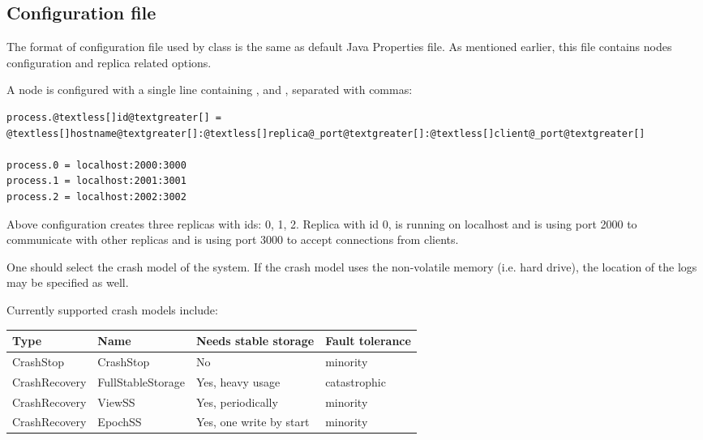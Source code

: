 \subsection{Configuration file}
\label{config:configuration-file}
The format of configuration file used by  class is the same as
default Java Properties file. As mentioned earlier, this file contains
nodes configuration and replica related options.


\label{config:node-configuration}
A node is configured with a single line containing ,  and , separated with commas:

\begin{Verbatim}[commandchars=@\[\]]
process.@textless[]id@textgreater[] = @textless[]hostname@textgreater[]:@textless[]replica@_port@textgreater[]:@textless[]client@_port@textgreater[]

process.0 = localhost:2000:3000
process.1 = localhost:2001:3001
process.2 = localhost:2002:3002
\end{Verbatim}

Above configuration creates three replicas with ids: 0, 1, 2. Replica with id 0,
is running on localhost and is using port 2000 to communicate with other replicas
and is using port 3000 to accept connections from clients.


\label{config:crash-model-selection}
One should select the crash model of the system. If the crash model uses the
non-volatile memory (i.e. hard drive), the location of the logs may be
specified as well.

Currently supported crash models include:

\begin{tabular}{|L|L|L|L|}
\hline
\textbf{
Type
} & \textbf{
Name
} & \textbf{
Needs stable storage
} & \textbf{
Fault tolerance
}\\
\hline

CrashStop
 & 
CrashStop
 & 
No
 & 
minority
\\

CrashRecovery
 & 
FullStableStorage
 & 
Yes, heavy usage
 & 
catastrophic
\\

CrashRecovery
 & 
ViewSS
 & 
Yes, periodically
 & 
minority
\\

CrashRecovery
 & 
EpochSS
 & 
Yes, one write by start
 & 
minority
\\
\hline
\end{tabular}

